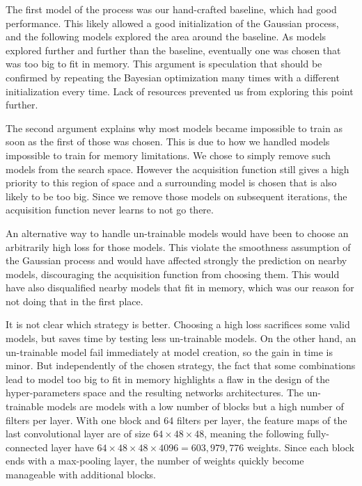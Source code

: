 The first model of the process was our hand-crafted baseline, which had good performance. This likely allowed a good initialization of the Gaussian process, and the following models explored the area around the baseline. As models explored further and further than the baseline, eventually one was chosen that was too big to fit in memory. This argument is speculation that should be confirmed by repeating the Bayesian optimization many times with a different initialization every time. Lack of resources prevented us from exploring this point further.

The second argument explains why most models became impossible to train as soon as the first of those was chosen. This is due to how we handled models impossible to train for memory limitations. We chose to simply remove such models from the search space. However the acquisition function still gives a high priority to this region of space and a surrounding model is chosen that is also likely to be too big. Since we remove those models on subsequent iterations, the acquisition function never learns to not go there.

An alternative way to handle un-trainable models would have been to choose an arbitrarily high loss for those models. This violate the smoothness assumption of the Gaussian process and would have affected strongly the prediction on nearby models, discouraging the acquisition function from choosing them. This would have also disqualified nearby models that fit in memory, which was our reason for not doing that in the first place. 

It is not clear which strategy is better. Choosing a high loss sacrifices some valid models, but saves time by testing less un-trainable models. On the other hand, an un-trainable model fail immediately at model creation, so the gain in time is minor. 
But independently of the chosen strategy, the fact that some combinations lead to model too big to fit in memory highlights a flaw in the design of the hyper-parameters space and the resulting networks architectures. The un-trainable models are models with a low number of blocks but a high number of filters per layer. With one block and 64 filters per layer, the feature maps of the last convolutional layer are of size $64 \times 48 \times 48$, meaning the following fully-connected layer have $64 \times 48 \times 48 \times 4096 = 603,979,776$ weights. Since each block ends with a max-pooling layer, the number of weights quickly become manageable with additional blocks. 

